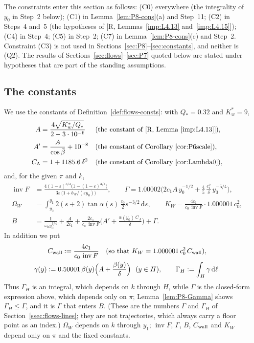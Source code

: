 \documentclass[11pt]{amsart}
\newcommand{\eps}{\varepsilon}
\newcommand{\invF}{\operatorname{inv}F}
\newcommand{\bbar}{\bar\beta}
\newcommand{\Lam}{\Lambda}
\newcommand{\dd}{\,\mathrm d}
\theoremstyle{definition}
\theoremstyle{remark}
\numberwithin{equation}{section}
\begin{document}
The constraints enter this section as follows: (C0) everywhere (the integrality of $y_0$ in Step~2 below); (C1) in
Lemma~\ref{lem:P8-cons}(a) and Step~11; (C2) in Steps~4 and~5 (the hypotheses of [R, Lemmas~\ref{imp:L4.13}
and~\ref{imp:L4.15}]); (C4) in Step~4; (C5) in Step~2; (C7) in Lemma~\ref{lem:P8-cons}(c) and Step~2. Constraint (C3)
is not used in Sections~\ref{sec:P8}--\ref{sec:constants}, and neither is (Q2). The results of
Sections~\ref{sec:flows}--\ref{sec:P7} quoted below are stated under hypotheses that are part of the standing
assumptions.

\subsection{The constants}\label{subsec:P8-constants}

We use the constants of Definition~\ref{def:flows-consts}: with $Q_*=0.32$ and $K_w^*=9$,
\begin{align*}
A&=\frac{4\sqrt{K_w^*/Q_*}}{2-3\cdot10^{-6}}&&\text{(the constant of [R, Lemma~\ref{imp:L4.13}])},\\
A'&=\frac{A}{\cos\bbar}+10^{-8}&&\text{(the constant of Corollary~\ref{cor:P6scale})},\\
C_\Lam&=1+1185.6\,\delta^2&&\text{(the constant of Corollary~\ref{cor:Lambda0})},
\end{align*}
and, for the given $\pi$ and $k$,
\begin{align*}
\invF&=\frac{4(1-\eps)^{3/4}\big(1-(1-\eps)^{3/4}\big)}{3\eps\,\big(1+b_W/(\eps y_0)\big)},\qquad
\Gamma=1.00002\Big(2c_1A\,y_0^{-1/2}+\frac45\,\frac{c_1^2}{\delta}\,y_0^{-5/4}\Big),\\
\Omega_W&=\int_{y_0}^{y_1}2(s+2)\tan\alpha(s)\,\frac{c_0}{2}s^{-3/2}\dd s,\qquad
K_W=\frac{4c_1}{c_0\,\invF}\cdot1.000001\,c_0^2,\\
B&=\frac1{\omega_0y_0^{3/4}}+\frac{A}{2c_1}+\frac{2c_1}{c_0\,\invF}\Big(A'+\frac{\alpha(y_0)\,C_\Lam}{\delta}\Big)+\Gamma .
\end{align*}
In addition we put
\begin{gather*}
C_{\rm wall}:=\frac{4c_1}{c_0\,\invF}\quad(\text{so that }K_W=1.000001\,c_0^2\,C_{\rm wall}),\\
\gamma(y):=0.50001\,\beta(y)\Big(A+\frac{\beta(y)}{\delta}\Big)\ \ (y\in H),\qquad
\Gamma_H:=\int_H\gamma\dd\ell .
\end{gather*}
Thus $\Gamma_H$ is an integral, which depends on $k$ through $H$, while $\Gamma$ is the closed-form expression above,
which depends only on $\pi$; Lemma~\ref{lem:P8-Gamma} shows $\Gamma_H\le\Gamma$, and it is $\Gamma$ that enters $B$.
(These are the numbers $\Gamma$ and $\Gamma_H$ of Section~\ref{ssec:flows-lines}; they are not trajectories, which
always carry a floor point as an index.)
$\Omega_W$ depends on $k$ through $y_1$; $\invF$, $\Gamma$, $B$, $C_{\rm wall}$ and $K_W$ depend only on $\pi$ and
the fixed constants.
\end{document}
